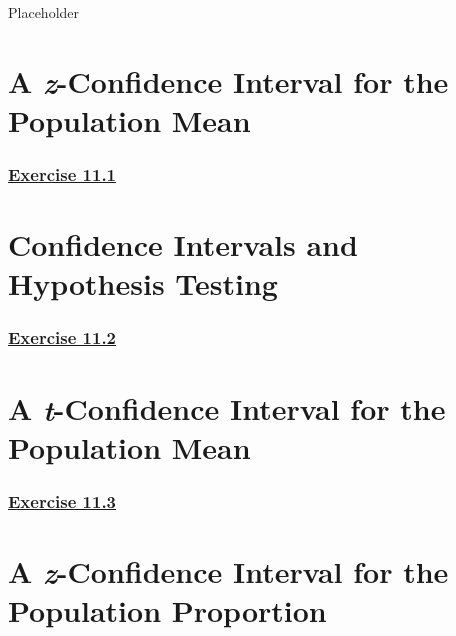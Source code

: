 \documentclass[
  11pt,
]{book}
\begin{document}
Placeholder

\section{\texorpdfstring{A \textit{z}-Confidence Interval for the Population Mean}{A -Confidence Interval for the Population Mean}}\label{a--confidence-interval-for-the-population-mean}

\subsubsection*{\texorpdfstring{\hyperref[ex111a]{Exercise 11.1}}{Exercise 11.1}}\label{exercise-11.1}

\section{Confidence Intervals and Hypothesis Testing}\label{confidence-intervals-and-hypothesis-testing}

\subsubsection*{\texorpdfstring{\hyperref[ex112a]{Exercise 11.2}}{Exercise 11.2}}\label{exercise-11.2}

\section{\texorpdfstring{A \textit{t}-Confidence Interval for the Population Mean}{A -Confidence Interval for the Population Mean}}\label{a--confidence-interval-for-the-population-mean-1}

\subsubsection*{\texorpdfstring{\hyperref[ex113a]{Exercise 11.3}}{Exercise 11.3}}\label{exercise-11.3}

\section{\texorpdfstring{A \textit{z}-Confidence Interval for the Population Proportion}{A -Confidence Interval for the Population Proportion}}\label{a--confidence-interval-for-the-population-proportion}
\end{document}
